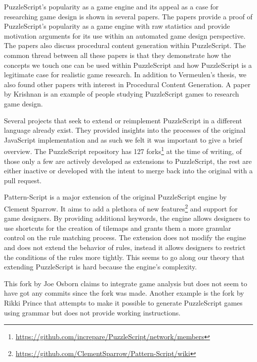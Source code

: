 PuzzleScript's popularity as a game engine and its appeal as a case for researching game design is shown in several papers\cite{osborn2015playspecs}\cite{8901975}\cite{10.1145/2908812.2908920}\cite{6932896}. The papers provide a proof of PuzzleScript's popularity as a game engine with raw statistics and provide motivation arguments for its use within an automated game design perspective. The papers also discuss procedural content generation within PuzzleScript. The common thread between all these papers is that they demonstrate how the concepts we touch one can be used within PuzzleScript and how PuzzleScript is a legitimate case for realistic game research. In addition to Vermeulen's thesis, we also found other papers with interest in Procedural Content Generation. A paper by Krishnan\cite{krishnan2018level} is an example of people studying PuzzleScript games to research game design.


Several projects that seek to extend or reimplement PuzzleScript in a different language already exist. They provided insights into the processes of the original JavaScript implementation and as such we felt it was important to give a brief overview. The PuzzleScript repository has 127 forks\footnote{\url{https://github.com/increpare/PuzzleScript/network/members}} at the time of writing, of those only a few are actively developed as extensions to PuzzleScript, the rest are either inactive or developed with the intent to merge back into the original with a pull request.

Pattern-Script\cite{PatternScript} is a major extension of the original PuzzleScript engine by Clement Sparrow. It aims to add a plethora of new features\footnote{\url{https://github.com/ClementSparrow/Pattern-Script/wiki}} and support for game designers. By providing additional keywords, the engine allows designers to use shortcuts for the creation of tilemaps and grants them a more granular control on the rule matching process. The extension does not modify the engine and does not extend the behavior of rules, instead it allows designers to restrict the conditions of the rules more tightly. This seems to go along our theory that extending PuzzleScript is hard because the engine's complexity.

This fork by Joe Osborn\cite{PuzzleScriptGA} claims to integrate game analysis but does not seem to have got any commits since the fork was made. Another example is the fork by Rikki Prince\cite{PuzzleScriptTracery} that attempts to make it possible to generate PuzzleScript games using grammar but does not provide working instructions. 

